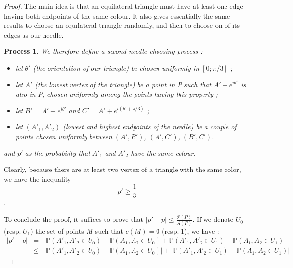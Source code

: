 \documentclass[a4paper,11pt]{article}
\newtheorem{process}{Process}
\begin{document}
\begin{proof}
The main idea is that an equilateral triangle must have at least one edge having both endpoints of the same colour.
It also gives essentially the same results to choose an equilateral triangle randomly, and then to choose on of its edges as our needle.


\begin{process}
We therefore define a second needle choosing process :
\begin{itemize}
  \item let $\theta '$ (the orientation of our triangle) be chosen uniformly in $[0;\pi / 3]$ ;
  \item let $A'$ (the lowest vertex of the triangle) be a point in $P$ such that $A' + e^{i\theta '}$ is also in $P$, chosen uniformly among the points having this property ;
  \item let $B' = A' + e^{i \theta '}$ and $C' = A' + e^{i (\theta ' + \pi / 3 ) }$ ;
  \item let $(A'_1,A'_2)$ (lowest and highest endpoints of the needle) be a couple of points chosen uniformly between $(A',B')$, $(A',C')$, $(B',C')$.
\end{itemize}
and $p'$ as the probability that $A'_1$ and $A'_2$ have the same colour.
\end{process}

Clearly, because there are at least two vertex of a triangle with the same color, we have the inequality $$p' \geq \frac{1}{3} $$.

To conclude the proof, it suffices to prove that $|p' - p| \leq \frac{\mathcal{P}(P)}{\mathcal{A}(P)}$.
If we denote $U_0$ (resp. $U_1$) the set of points $M$ such that $c(M) = 0$ (resp. $1$), we have :
\begin{eqnarray*}
|p' - p| 
  &=& | \mathbb{P}(A'_1 , A'_2 \in U_0) - \mathbb{P}(A_1 , A_2 \in U_0) + \mathbb{P}(A'_1 , A'_2 \in U_1) - \mathbb{P}(A_1 , A_2 \in U_1) | \\
  &\leq& | \mathbb{P}(A'_1 , A'_2 \in U_0) - \mathbb{P}(A_1 , A_2 \in U_0) | + | \mathbb{P}(A'_1 , A'_2 \in U_1) - \mathbb{P}(A_1 , A_2 \in U_1) |
\end{eqnarray*}


\end{proof}
\end{document}
